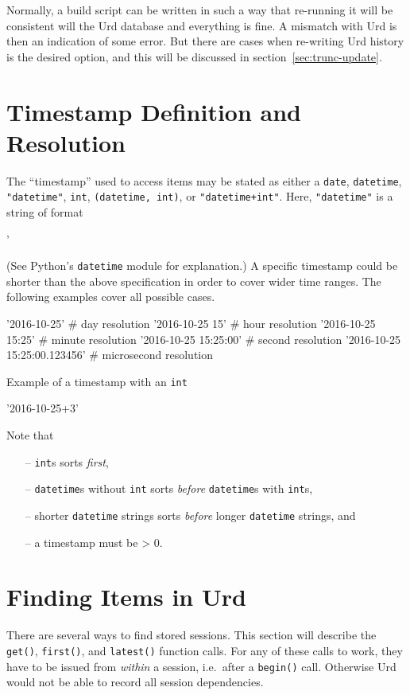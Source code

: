 Normally, a build script can be written in such a way that re-running
it will be consistent will the Urd database and everything is fine.  A
mismatch with Urd is then an indication of some error.  But there are
cases when re-writing Urd history is the desired option, and this will
be discussed in section~\ref{sec:trunc-update}.







\section{Timestamp Definition and Resolution}
The ``timestamp'' used to access items may be stated as either
a \texttt{date}, \texttt{datetime}, \texttt{"datetime"}, \texttt{int}, \texttt{(datetime,
int)}, or \texttt{"datetime+int"}.  Here, \texttt{"datetime"} is a
string of format
\begin{shell}
'%
\end{shell}
(See Python's \texttt{datetime} module for explanation.)  A specific
timestamp could be shorter than the above specification in order to
cover wider time ranges.  The following examples cover all possible
cases.
\begin{python}
'2016-10-25'                 # day resolution
'2016-10-25 15'              # hour resolution
'2016-10-25 15:25'           # minute resolution
'2016-10-25 15:25:00'        # second resolution
'2016-10-25 15:25:00.123456' # microsecond resolution
\end{python}
Example of a timestamp with an \texttt{int}
\begin{python}
'2016-10-25+3'
\end{python}
Note that
\begin{itemize}
  \item[--] \texttt{int}s sorts \textsl{first}, 
  \item[--] \texttt{datetime}s without \texttt{int} sorts \textsl{before} \texttt{datetime}s with \texttt{int}s, 
  \item[--] shorter \texttt{datetime} strings sorts \textsl{before} longer \texttt{datetime} strings, and
  \item[--] a timestamp must be > 0.
\end{itemize}



\section{Finding Items in Urd}
There are several ways to find stored sessions.  This section will
describe the \texttt{get()}, \texttt{first()}, and \texttt{latest()}
function calls.  For any of these calls to work, they have to be
issued from \textsl{within} a session, i.e.\ after a \texttt{begin()}
call.  Otherwise Urd would not be able to record all session
dependencies.


